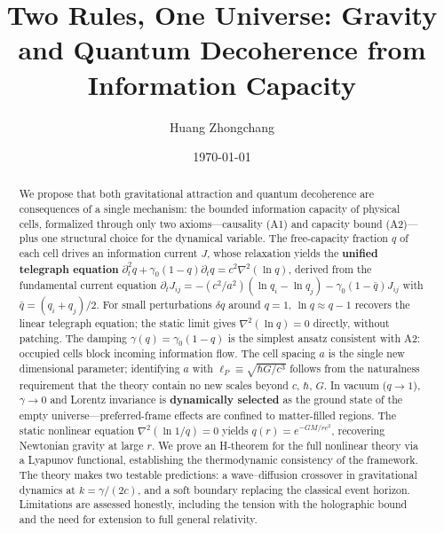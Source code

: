 \documentclass[aps,prd,twocolumn,showpacs,superscriptaddress,preprintnumbers]{revtex4-2}
\begin{document}
\title{Two Rules, One Universe: Gravity and Quantum Decoherence from Information Capacity}

\author{Huang Zhongchang}

\date{\today}

\begin{abstract}
We propose that both gravitational attraction and quantum decoherence are consequences of a single mechanism: the bounded information capacity of physical cells, formalized through only two axioms---causality (A1) and capacity bound (A2)---plus one structural choice for the dynamical variable.
The free-capacity fraction $q$ of each cell drives an information current $J$, whose relaxation yields the \textbf{unified telegraph equation}
$\partial_t^2 q + \gamma_0(1-q)\partial_t q = c^2\nabla^2(\ln q)$,
derived from the fundamental current equation
$\partial_t J_{ij} = -(c^2/a^2)(\ln q_i - \ln q_j) - \gamma_0(1-\bar{q})J_{ij}$
with $\bar{q}=(q_i+q_j)/2$.
For small perturbations $\delta q$ around $q=1$, $\ln q\approx q-1$ recovers the linear telegraph equation; the static limit gives $\nabla^2(\ln q)=0$ directly, without patching.
The damping $\gamma(q)=\gamma_0(1-q)$ is the simplest ansatz consistent with A2: occupied cells block incoming information flow.
The cell spacing $a$ is the single new dimensional parameter; identifying $a$ with $\ell_P\equiv\sqrt{\hbar G/c^3}$ follows from the naturalness requirement that the theory contain no new scales beyond $c$, $\hbar$, $G$.
In vacuum ($q\to1$), $\gamma\to0$ and Lorentz invariance is \textbf{dynamically selected} as the ground state of the empty universe---preferred-frame effects are confined to matter-filled regions.
The static nonlinear equation $\nabla^2(\ln 1/q)=0$ yields $q(r)=e^{-GM/rc^2}$, recovering Newtonian gravity at large $r$.
We prove an H-theorem for the full nonlinear theory via a Lyapunov functional, establishing the thermodynamic consistency of the framework.
The theory makes two testable predictions: a wave--diffusion crossover in gravitational dynamics at $k=\gamma/(2c)$, and a soft boundary replacing the classical event horizon.
Limitations are assessed honestly, including the tension with the holographic bound and the need for extension to full general relativity.
\end{abstract}

\maketitle
\end{document}
